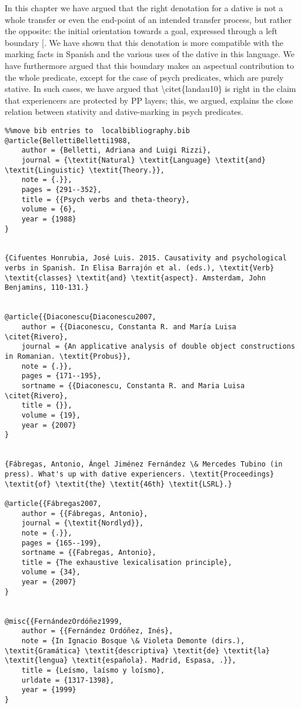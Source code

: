 \documentclass[output=paper,modfonts,nonflat]{langsci/langscibook}
\begin{document}
In this chapter we have argued that the right denotation for a dative is not a whole transfer or even the end-point of an intended transfer process, but rather the opposite: the initial orientation towards a goal, expressed through a left boundary [. We have shown that this denotation is more compatible with the marking facts in Spanish and the various uses of the dative in this language. We have furthermore argued that this boundary makes an aspectual contribution to the whole predicate, except for the case of psych predicates, which are purely stative. In such cases, we have argued that {\textbackslash}citet\{landau10\} is right in the claim that experiencers are protected by PP layers; this, we argued, explains the close relation between stativity and dative-marking in psych predicates.
\begin{verbatim}%%move bib entries to  localbibliography.bib
@article{BellettiBelletti1988,
	author = {Belletti, Adriana and Luigi Rizzi},
	journal = {\textit{Natural} \textit{Language} \textit{and} \textit{Linguistic} \textit{Theory.}},
	note = {.}},
	pages = {291--352},
	title = {{Psych verbs and theta-theory},
	volume = {6},
	year = {1988}
}


{Cifuentes Honrubia, José Luis. 2015. Causativity and psychological verbs in Spanish. In Elisa Barrajón et al. (eds.), \textit{Verb} \textit{classes} \textit{and} \textit{aspect}. Amsterdam, John Benjamins, 110-131.}


@article{{Diaconescu{Diaconescu2007,
	author = {{Diaconescu, Constanta R. and María Luisa \citet{Rivero},
	journal = {An applicative analysis of double object constructions in Romanian. \textit{Probus}},
	note = {.}},
	pages = {171--195},
	sortname = {{Diaconescu, Constanta R. and Maria Luisa \citet{Rivero},
	title = {}},
	volume = {19},
	year = {2007}
}


{Fábregas, Antonio, Ángel Jiménez Fernández \& Mercedes Tubino (in press). What's up with dative experiencers. \textit{Proceedings} \textit{of} \textit{the} \textit{46th} \textit{LSRL}.}

@article{{Fábregas2007,
	author = {{Fábregas, Antonio},
	journal = {\textit{Nordlyd}},
	note = {.}},
	pages = {165--199},
	sortname = {{Fabregas, Antonio},
	title = {The exhaustive lexicalisation principle},
	volume = {34},
	year = {2007}
}


@misc{{FernándezOrdóñez1999,
	author = {{Fernández Ordóñez, Inés},
	note = {In Ignacio Bosque \& Violeta Demonte (dirs.), \textit{Gramática} \textit{descriptiva} \textit{de} \textit{la} \textit{lengua} \textit{española}. Madrid, Espasa, .}},
	title = {Leísmo, laísmo y loísmo},
	urldate = {1317-1398},
	year = {1999}
}



\end{verbatim}
\end{document}
